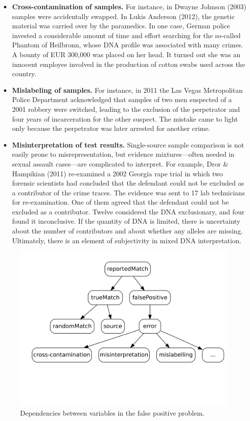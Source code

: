 \documentclass[
  10pt,
  dvipsnames,enabledeprecatedfontcommands]{scrartcl}
\begin{document}
\begin{itemize}
\item
  \textbf{Cross-contamination of samples.} For instance, in Dwayne
  Johnson (2003) samples were accidentally swapped. In Lukis Anderson
  (2012), the genetic material was carried over by the paramedics. In
  one case, German police invested a considerable amount of time and
  effort searching for the so-called Phantom of Heilbronn, whose DNA
  profile was associated with many crimes. A bounty of EUR 300,000 was
  placed on her head. It turned out she was an innocent employee
  involved in the production of cotton swabs used across the country.
\item
  \textbf{Mislabeling of samples.} For instance, in 2011 the Las Vegas
  Metropolitan Police Department acknowledged that samples of two men
  suspected of a 2001 robbery were switched, leading to the exclusion of
  the perpetrator and four years of incarceration for the other suspect.
  The mistake came to light only because the perpetrator was later
  arrested for another crime.
\item
  \textbf{Misinterpretation of test results.} Single-source sample
  comparison is not easily prone to misrepresentation, but evidence
  mixtures---often needed in sexual assault cases---are complicated to
  interpret. For example, Dror \& Hampikian (2011) re-examined a 2002
  Georgia rape trial in which two forensic scientists had concluded that
  the defendant could not be excluded as a contributor of the crime
  traces. The evidence was sent to 17 lab technicians for
  re-examination. One of them agreed that the defendant could not be
  excluded as a contributor. Twelve considered the DNA exclusionary, and
  four found it inconclusive. If the quantity of DNA is limited, there
  is uncertainty about the number of contributors and about whether any
  alleles are missing. Ultimately, there is an element of subjectivity
  in mixed DNA interpretation.
\end{itemize}

\begin{center}
\begin{figure}
\includegraphics[width = 12cm]{img/fpp.png}
\caption{Dependencies between variables in the false positive problem.}
\label{fig:fpp}
\end{figure}
\end{center}
\end{document}
